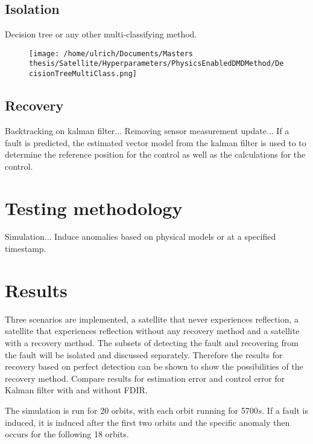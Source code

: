 \documentclass[letterpaper, 10 pt, conference]{ieeeconf}  %
\begin{document}
\subsection{Isolation}
Decision tree or any other multi-classifying method.

\begin{figure}[!htb]
\texttt{[image: /home/ulrich/Documents/Masters thesis/Satellite/Hyperparameters/PhysicsEnabledDMDMethod/DecisionTreeMultiClass.png]}
\end{figure}


\subsection{Recovery}
Backtracking on kalman filter... Removing sensor measurement update... If a fault is predicted, the estimated vector model from the kalman filter is used to to determine the reference position for the control as well as the calculations for the control.

\section{Testing methodology}
Simulation... Induce anomalies based on physical models or at a specified timestamp.

\section{Results}
Three scenarios are implemented, a satellite that never experiences reflection, a satellite that experiences reflection without any recovery method and a satellite with a recovery method. The subsets of detecting the fault and recovering from the fault will be isolated and discussed separately. Therefore the results for recovery based on perfect detection can be shown to show the possibilities of the recovery method.
Compare results for estimation error and control error for Kalman filter with and without FDIR.

The simulation is run for 20 orbits, with each orbit running for 5700$s$. If a fault is induced, it is induced after the first two orbits and the specific anomaly then occurs for the following 18 orbits.

\newpage
\end{document}
